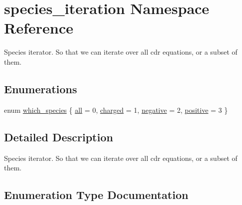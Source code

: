 \hypertarget{namespacespecies__iteration}{}\section{species\+\_\+iteration Namespace Reference}
\label{namespacespecies__iteration}


Species iterator. So that we can iterate over all cdr equations, or a subset of them.  


\subsection*{Enumerations}
\begin{DoxyCompactItemize}
\item 
enum \hyperlink{namespacespecies__iteration_a3384cfe7d9c1a8fa3dbc0c75efc8fb7e}{which\+\_\+species} \{ \hyperlink{namespacespecies__iteration_a3384cfe7d9c1a8fa3dbc0c75efc8fb7ea26e8600c438a9172a790f5b93e5b359f}{all} = 0, 
\hyperlink{namespacespecies__iteration_a3384cfe7d9c1a8fa3dbc0c75efc8fb7ea1f40cbecd9cc2690a062e037691639cb}{charged} = 1, 
\hyperlink{namespacespecies__iteration_a3384cfe7d9c1a8fa3dbc0c75efc8fb7eab23ea9357f75772b1ac5c4de7bca1a00}{negative} = 2, 
\hyperlink{namespacespecies__iteration_a3384cfe7d9c1a8fa3dbc0c75efc8fb7eab0931fcb7a290beaedce04f930b766be}{positive} = 3
 \}
\end{DoxyCompactItemize}


\subsection{Detailed Description}
Species iterator. So that we can iterate over all cdr equations, or a subset of them. 

\subsection{Enumeration Type Documentation}

